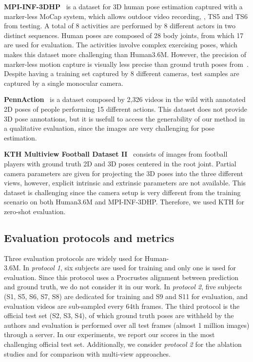 \documentclass[10pt,twocolumn,letterpaper]{article}
\newcommand{\revb}[1]{{#1}}
\begin{document}
\noindent
\textbf{MPI-INF-3DHP}~\cite{Mehta_2017_3DV} is a dataset for 3D human
pose estimation captured with a marker-less MoCap system, which allows outdoor
video recording, \eg, TS5 and TS6 from testing. A total of 8 activities are
performed by 8 different actors in two distinct sequences.  Human poses are
composed of 28 body joints, from which 17 are used for evaluation.
The activities involve complex exercising poses, which makes this dataset
more challenging than Human3.6M. However, the precision of marker-less
motion capture is visually less precise than ground truth poses
from~\cite{h36m_pami}.  Despite having a training set captured by 8 different
cameras, test samples are captured by a single monocular camera.

\noindent
\revb{
\textbf{PennAction}~\cite{Zhang_PennAction} is a dataset composed by 2,326
videos in the wild with annotated 2D poses of people performing 15 different
actions. This dataset does not provide 3D pose annotations, but it is usefull to
access the generability of our method in a qualitative evaluation, since the
images are very challenging for pose estimation.
}

\noindent
\revb{
\textbf{KTH Multiview Football Dataset II}~\cite{kazemi2013multi} consists of images from football players with ground truth 2D and 3D poses centered in the root joint. Partial camera parameters are given for projecting the 3D poses into the three different views, however, explicit intrinsic and extrinsic parameters are not available. This dataset is challenging since the camera setup is very different from the training scenario on both Human3.6M and MPI-INF-3DHP. Therefore, we used KTH for zero-shot evaluation.
}

\subsection{Evaluation protocols and metrics}

Three evaluation protocols are widely used for Human-\\
3.6M. In \textit{protocol
1}, six subjects are used for training and only one is used for evaluation.
Since this protocol uses a Procrustes alignment between prediction and ground
truth, we do not consider it in our work.
In \textit{protocol 2}, five subjects (S1, S5, S6, S7, S8) are dedicated for
training and S9 and S11 for evaluation, and evaluation videos are
sub-sampled every 64th frames.
The third protocol is the official test set (S2, S3, S4), of which ground truth
poses are withheld by the authors and evaluation is performed over all test
frames (almost 1 million images) through a server. In our experiments,
we report our scores in the most challenging official test set. Additionally,
we consider \textit{protocol 2} for the ablation studies and for comparison
with multi-view approaches.
\end{document}
